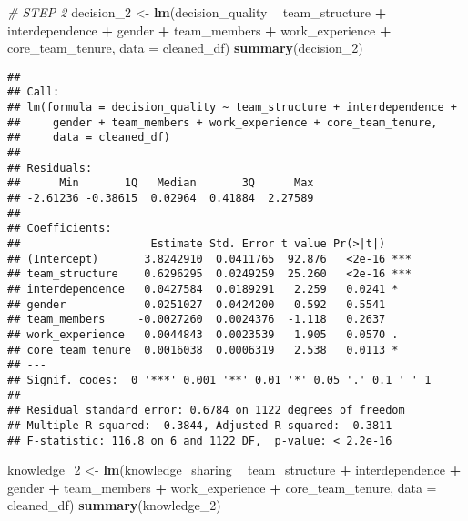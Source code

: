 \documentclass[]{article}
\newenvironment{Shaded}{\begin{snugshade}}{\end{snugshade}}
\newcommand{\CommentTok}[1]{\textcolor[rgb]{0.56,0.35,0.01}{\textit{#1}}}
\newcommand{\DataTypeTok}[1]{\textcolor[rgb]{0.13,0.29,0.53}{#1}}
\newcommand{\DecValTok}[1]{\textcolor[rgb]{0.00,0.00,0.81}{#1}}
\newcommand{\KeywordTok}[1]{\textcolor[rgb]{0.13,0.29,0.53}{\textbf{#1}}}
\newcommand{\NormalTok}[1]{#1}
\newcommand{\OperatorTok}[1]{\textcolor[rgb]{0.81,0.36,0.00}{\textbf{#1}}}
\newcommand{\StringTok}[1]{\textcolor[rgb]{0.31,0.60,0.02}{#1}}
\begin{document}
\begin{Shaded}
\begin{Highlighting}[]
\CommentTok{# STEP 2}
\NormalTok{decision_}\DecValTok{2}\NormalTok{ <-}\StringTok{ }\KeywordTok{lm}\NormalTok{(decision_quality }\OperatorTok{~}\StringTok{ }\NormalTok{team_structure }\OperatorTok{+}\StringTok{ }\NormalTok{interdependence }\OperatorTok{+}\StringTok{ }\NormalTok{gender }\OperatorTok{+}\StringTok{ }\NormalTok{team_members }\OperatorTok{+}\StringTok{ }\NormalTok{work_experience }\OperatorTok{+}\StringTok{ }\NormalTok{core_team_tenure, }\DataTypeTok{data =}\NormalTok{ cleaned_df)}
\KeywordTok{summary}\NormalTok{(decision_}\DecValTok{2}\NormalTok{)}
\end{Highlighting}
\end{Shaded}

\begin{verbatim}
## 
## Call:
## lm(formula = decision_quality ~ team_structure + interdependence + 
##     gender + team_members + work_experience + core_team_tenure, 
##     data = cleaned_df)
## 
## Residuals:
##      Min       1Q   Median       3Q      Max 
## -2.61236 -0.38615  0.02964  0.41884  2.27589 
## 
## Coefficients:
##                    Estimate Std. Error t value Pr(>|t|)    
## (Intercept)       3.8242910  0.0411765  92.876   <2e-16 ***
## team_structure    0.6296295  0.0249259  25.260   <2e-16 ***
## interdependence   0.0427584  0.0189291   2.259   0.0241 *  
## gender            0.0251027  0.0424200   0.592   0.5541    
## team_members     -0.0027260  0.0024376  -1.118   0.2637    
## work_experience   0.0044843  0.0023539   1.905   0.0570 .  
## core_team_tenure  0.0016038  0.0006319   2.538   0.0113 *  
## ---
## Signif. codes:  0 '***' 0.001 '**' 0.01 '*' 0.05 '.' 0.1 ' ' 1
## 
## Residual standard error: 0.6784 on 1122 degrees of freedom
## Multiple R-squared:  0.3844, Adjusted R-squared:  0.3811 
## F-statistic: 116.8 on 6 and 1122 DF,  p-value: < 2.2e-16
\end{verbatim}

\begin{Shaded}
\begin{Highlighting}[]
\NormalTok{knowledge_}\DecValTok{2}\NormalTok{ <-}\StringTok{ }\KeywordTok{lm}\NormalTok{(knowledge_sharing }\OperatorTok{~}\StringTok{ }\NormalTok{team_structure }\OperatorTok{+}\StringTok{ }\NormalTok{interdependence }\OperatorTok{+}\StringTok{ }\NormalTok{gender }\OperatorTok{+}\StringTok{ }\NormalTok{team_members }\OperatorTok{+}\StringTok{ }\NormalTok{work_experience }\OperatorTok{+}\StringTok{ }\NormalTok{core_team_tenure, }\DataTypeTok{data =}\NormalTok{ cleaned_df)}
\KeywordTok{summary}\NormalTok{(knowledge_}\DecValTok{2}\NormalTok{)}
\end{Highlighting}
\end{Shaded}
\end{document}

